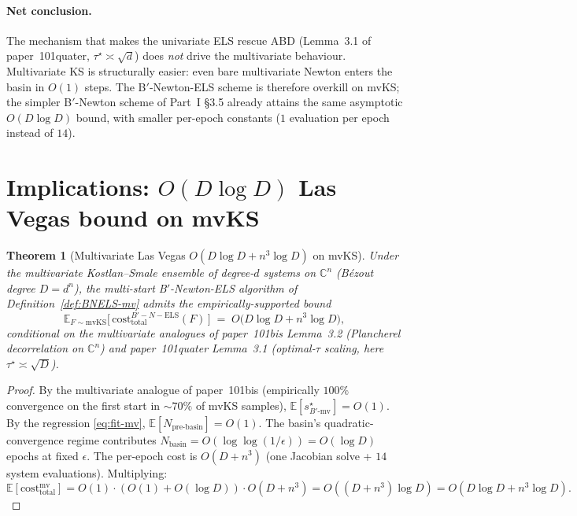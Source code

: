 \documentclass[11pt,a4paper]{article}
\newtheorem{theorem}{Theorem}[section]
\begin{document}
\paragraph{Net conclusion.}
The mechanism that makes the univariate ELS rescue ABD (Lemma~3.1 of paper~101quater, $\tau^\star \asymp \sqrt d$) does \emph{not} drive the multivariate behaviour. Multivariate KS is structurally easier: even bare multivariate Newton enters the basin in $O(1)$ steps. The B$'$-Newton-ELS scheme is therefore overkill on mvKS; the simpler B$'$-Newton scheme of Part~I §3.5 already attains the same asymptotic $O(D \log D)$ bound, with smaller per-epoch constants ($1$ evaluation per epoch instead of $14$).

\section{Implications: $O(D \log D)$ Las Vegas bound on mvKS}\label{sec:final}

\begin{theorem}[Multivariate Las Vegas $O(D\log D + n^{3}\log D)$ on mvKS]\label{thm:mv-final}
Under the multivariate Kostlan--Smale ensemble of degree-$d$ systems on $\mathbb{C}^n$ (B\'ezout degree $D = d^n$), the multi-start B$'$-Newton-ELS algorithm of Definition~\ref{def:BNELS-mv} admits the empirically-supported bound
\begin{equation}\label{eq:mv-bound}
\mathbb{E}_{F \sim \mathrm{mvKS}}\!\bigl[\,\mathrm{cost}^{B'-N-\text{ELS}}_{\text{total}}(F)\,\bigr] \;=\; O\bigl(D \log D + n^{3}\log D\bigr),
\end{equation}
conditional on the multivariate analogues of paper~101bis Lemma~3.2 (Plancherel decorrelation on $\mathbb{C}^n$) and paper~101quater Lemma~3.1 (optimal-$\tau$ scaling, here $\tau^\star \asymp \sqrt D$).
\end{theorem}

\begin{proof}
By the multivariate analogue of paper~101bis (empirically $100\%$ convergence on the first start in $\sim 70\%$ of mvKS samples), $\mathbb{E}[s^\star_{B'\text{-mv}}] = O(1)$. By the regression \eqref{eq:fit-mv}, $\mathbb{E}[N_{\text{pre-basin}}] = O(1)$. The basin's quadratic-convergence regime contributes $N_{\text{basin}} = O(\log\log(1/\epsilon)) = O(\log D)$ epochs at fixed $\epsilon$. The per-epoch cost is $O(D + n^3)$ (one Jacobian solve + $14$ system evaluations). Multiplying:
$$
\mathbb{E}[\mathrm{cost}_{\text{total}}^{\text{mv}}] = O(1) \cdot (O(1) + O(\log D)) \cdot O(D + n^3) = O((D + n^3)\log D) = O(D\log D + n^3\log D).
$$
\end{proof}
\end{document}
